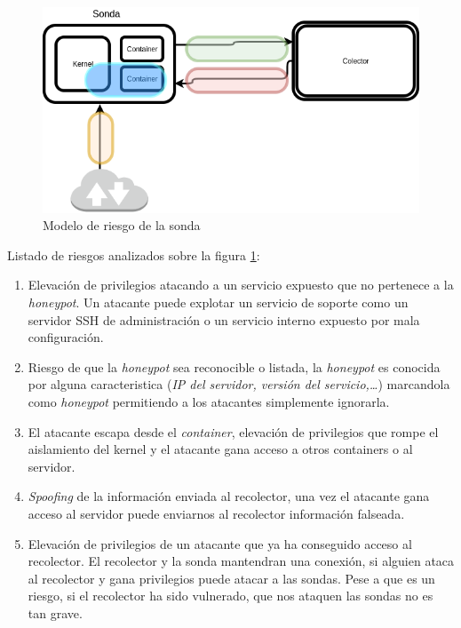 \begin{figure}[!h]
  \centering
    \includegraphics[scale=0.4]{images/threat_model_probe}
  \caption{Modelo de riesgo de la sonda}
  \label{fig:riesgo_sonda}
\end{figure}

Listado de riesgos analizados sobre la figura \ref{fig:riesgo_sonda}:
\begin{enumerate}
    \item[\emph{Naranja 1}] Elevación de privilegios atacando a un servicio expuesto que no pertenece a la \emph{honeypot}. Un atacante puede explotar un servicio de soporte como un servidor SSH de administración o un servicio interno expuesto por mala configuración.
    \item[\emph{Naranja 2}] Riesgo de que la \emph{honeypot} sea reconocible o listada, la \emph{honeypot} es conocida por alguna caracteristica (\emph{IP del servidor, versión del servicio,\ldots}) marcandola como \emph{honeypot} permitiendo a los atacantes simplemente ignorarla.
    \item[\emph{Azul}] El atacante escapa desde el \emph{container}, elevación de privilegios que rompe el aislamiento del kernel y el atacante gana acceso a otros containers o al servidor.
    \item[\emph{Verde}] \emph{Spoofing} de la información enviada al recolector, una vez el atacante gana acceso al servidor puede enviarnos al recolector información falseada.
    \item[\emph{Rojo}] Elevación de privilegios de un atacante que ya ha conseguido acceso al recolector. El recolector y la sonda mantendran una conexión, si alguien ataca al recolector y gana privilegios puede atacar a las sondas. Pese a que es un riesgo, si el recolector ha sido vulnerado, que nos ataquen las sondas no es tan grave.
\end{enumerate}

